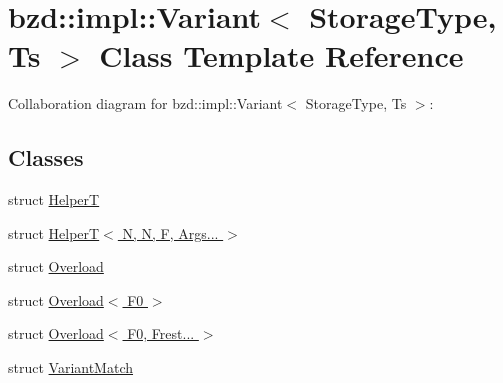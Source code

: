 \hypertarget{classbzd_1_1impl_1_1Variant}{}\section{bzd\+:\+:impl\+:\+:Variant$<$ Storage\+Type, Ts $>$ Class Template Reference}
\label{classbzd_1_1impl_1_1Variant}


Collaboration diagram for bzd\+:\+:impl\+:\+:Variant$<$ Storage\+Type, Ts $>$\+:
\subsection*{Classes}
\begin{DoxyCompactItemize}
\item 
struct \hyperlink{structbzd_1_1impl_1_1Variant_1_1HelperT}{HelperT}
\item 
struct \hyperlink{structbzd_1_1impl_1_1Variant_1_1HelperT_3_01N_00_01N_00_01F_00_01Args_8_8_8_01_4}{Helper\+T$<$ N, N, F, Args... $>$}
\item 
struct \hyperlink{structbzd_1_1impl_1_1Variant_1_1Overload}{Overload}
\item 
struct \hyperlink{structbzd_1_1impl_1_1Variant_1_1Overload_3_01F0_01_4}{Overload$<$ F0 $>$}
\item 
struct \hyperlink{structbzd_1_1impl_1_1Variant_1_1Overload_3_01F0_00_01Frest_8_8_8_01_4}{Overload$<$ F0, Frest... $>$}
\item 
struct \hyperlink{structbzd_1_1impl_1_1Variant_1_1VariantMatch}{Variant\+Match}
\end{DoxyCompactItemize}
